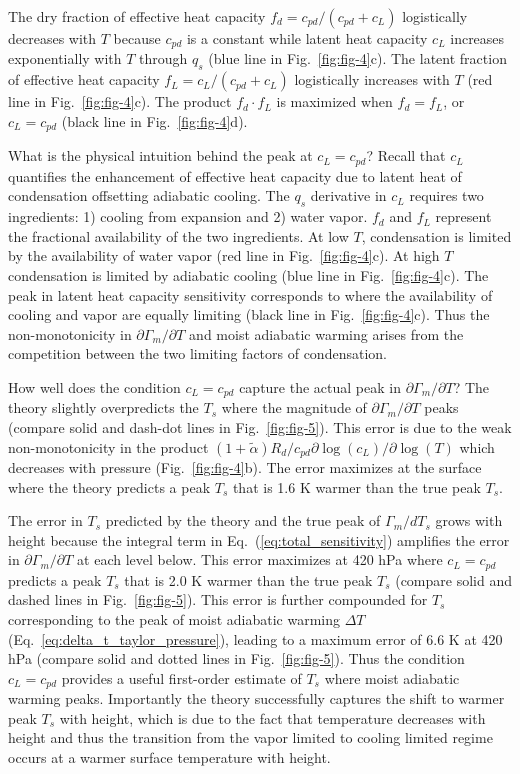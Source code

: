 \documentclass[draft]{ametsocV6.1}
\begin{document}
The dry fraction of effective heat capacity $f_d=c_{pd}/(c_{pd}+c_L)$ logistically decreases with $T$ because $c_{pd}$ is a constant while latent heat capacity $c_L$ increases exponentially with $T$ through $q_s$ (blue line in Fig.~\ref{fig:fig-4}c). The latent fraction of effective heat capacity $f_L = c_L / (c_{pd}+c_L)$ logistically increases with $T$ (red line in Fig.~\ref{fig:fig-4}c). The product $f_d\cdot f_L$ is maximized when $f_d=f_L$, or $c_L = c_{pd}$ (black line in Fig.~\ref{fig:fig-4}d).

What is the physical intuition behind the peak at $c_L = c_{pd}$? Recall that $c_L$ quantifies the enhancement of effective heat capacity due to latent heat of condensation offsetting adiabatic cooling. The $q_s$ derivative in $c_L$ requires two ingredients: 1) cooling from expansion and 2) water vapor. $f_d$ and $f_L$ represent the fractional availability of the two ingredients. At low $T$, condensation is limited by the availability of water vapor (red line in Fig.~\ref{fig:fig-4}c). At high $T$ condensation is limited by adiabatic cooling (blue line in Fig.~\ref{fig:fig-4}c). The peak in latent heat capacity sensitivity corresponds to where the availability of cooling and vapor are equally limiting (black line in Fig.~\ref{fig:fig-4}c). Thus the non-monotonicity in $\partial\Gamma_m/\partial T$ and moist adiabatic warming arises from the competition between the two limiting factors of condensation.

How well does the condition $c_L = c_{pd}$ capture the actual peak in $\partial\Gamma_m/\partial T$? The theory slightly overpredicts the $T_s$ where the magnitude of $\partial\Gamma_m/\partial T$ peaks (compare solid and dash-dot lines in Fig.~\ref{fig:fig-5}). This error is due to the weak non-monotonicity in the product $(1+\tilde{\alpha})R_d/c_{pd}\partial\log(c_L)/\partial\log(T)$ which decreases with pressure (Fig.~\ref{fig:fig-4}b). The error maximizes at the surface where the theory predicts a peak $T_s$ that is 1.6 K warmer than the true peak $T_s$. 

The error in $T_s$ predicted by the theory and the true peak of $\Gamma_m / d T_s$ grows with height because the integral term in Eq.~(\ref{eq:total_sensitivity}) amplifies the error in $\partial\Gamma_m / \partial T$ at each level below. This error maximizes at 420 hPa where $c_L = c_{pd}$ predicts a peak $T_s$ that is 2.0 K warmer than the true peak $T_s$ (compare solid and dashed lines in Fig.~\ref{fig:fig-5}). This error is further compounded for $T_s$ corresponding to the peak of moist adiabatic warming $\Delta T$ (Eq.~\ref{eq:delta_t_taylor_pressure}), leading to a maximum error of 6.6 K at 420 hPa (compare solid and dotted lines in Fig.~\ref{fig:fig-5}). Thus the condition $c_L = c_{pd}$ provides a useful first-order estimate of $T_s$ where moist adiabatic warming peaks. Importantly the theory successfully captures the shift to warmer peak $T_s$ with height, which is due to the fact that temperature decreases with height and thus the transition from the vapor limited to cooling limited regime occurs at a warmer surface temperature with height.
\end{document}
